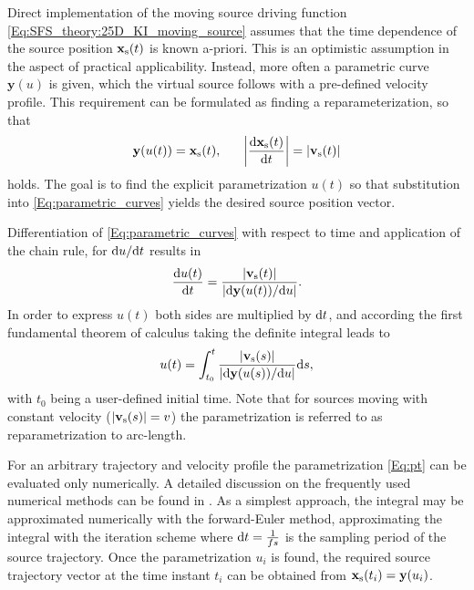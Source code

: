 Direct implementation of the moving source driving function \eqref{Eq:SFS_theory:25D_KI_moving_source} assumes that the time dependence of the source position $\mathbf{x}_{\mathrm{s}}(t)$ is known a-priori. 
This is an optimistic assumption in the aspect of practical applicability. 
Instead, more often a parametric curve $\mathbf{y}(u)$ is given, which the virtual source follows with a pre-defined velocity profile.
This requirement can be formulated as finding a reparameterization, so that 
\begin{equation}
\mathbf{y}(u(t)) = \mathbf{x}_{\mathrm{s}}(t), \hspace{6mm} \left| \frac{\mathrm{d} \mathbf{x}_{\mathrm{s}}(t)}{\mathrm{d} t} \right| = |\mathbf{v}_{\mathrm{s}}(t)| 
\label{Eq:parametric_curves}
\end{equation}
holds. 
The goal is to find the explicit parametrization $u(t)$ so that substitution into \eqref{Eq:parametric_curves} yields the desired source position vector.

Differentiation of \eqref{Eq:parametric_curves} with respect to time and application of the chain rule, for $\mathrm{d} u / \mathrm{d} t$ results in
%
\begin{equation}
 \frac{\mathrm{d} u(t) }{\mathrm{d} t} = \frac{|\mathbf{v}_{\mathrm{s}}(t)|}{\left| \mathrm{d} \mathbf{y}(u(t)) / \mathrm{d} u \right|}.
\end{equation}
In order to express $u(t)$ both sides are multiplied by $\mathrm{d} t$, and according the first fundamental theorem of calculus taking the definite integral leads to
\begin{equation}
u(t) = \int_{t_0}^{t} \frac{|\mathbf{v}_{\mathrm{s}}(s)|}{\left| \mathrm{d} \mathbf{y}(u(s)) / \mathrm{d} u \right|} \mathrm{d} s,
\label{Eq:pt}
\end{equation}
with $t_0$ being a user-defined initial time.
Note that for sources moving with constant velocity ($|\mathbf{v}_{\mathrm{s}}(s)| = v$) the parametrization is referred to as reparametrization to arc-length.

For an arbitrary trajectory and velocity profile the parametrization \eqref{Eq:pt} can be evaluated only numerically.
A detailed discussion on the frequently used numerical methods can be found in \cite{Parent2012}.
As a simplest approach, the integral may be approximated numerically with the forward-Euler method, approximating the integral with the iteration scheme
where $\mathrm{d} t = \frac{1}{fs}$ is the sampling period of the source trajectory.
Once the parametrization $u_i$ is found, the required source trajectory vector at the time instant $t_i$ can be obtained from $\mathbf{x}_{\mathrm{s}}(t_i) = \mathbf{y}(u_i)$. 

